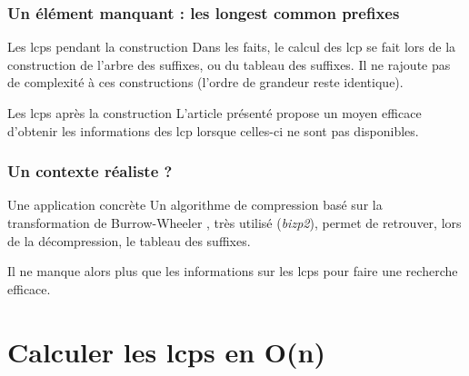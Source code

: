 \documentclass[10pt]{beamer}
\begin{document}
\begin{frame}
  \frametitle{Un élément manquant : les longest common prefixes}

  \begin{block}{Les lcps pendant la construction}
      Dans les faits, le calcul des lcp se fait lors de la construction de
      l'arbre des suffixes, ou du tableau des suffixes. Il ne rajoute pas
      de complexité à ces constructions (l'ordre de grandeur reste
      identique).
  \end{block}
  \pause
  \begin{block}{Les lcps après la construction}
    L'article présenté propose un moyen efficace d'obtenir
    les informations des lcp lorsque celles-ci ne sont pas
    disponibles\cite{Kasai01}.
  \end{block}

\end{frame}


\begin{frame}
  \frametitle{Un contexte réaliste ?}
  
  \begin{block}{Une application concrète}
    Un algorithme de compression basé sur la transformation de
    Burrow-Wheeler \cite{Burrows94}, très utilisé (\emph{bizp2}), permet
    de retrouver, lors de la décompression, le tableau des suffixes. 
    
    Il ne manque alors plus que les informations sur les lcps pour faire
    une recherche efficace. 
  \end{block}

\end{frame}

\section{Calculer les lcps en O(n)}
\label{sec:algo}

\end{document}
